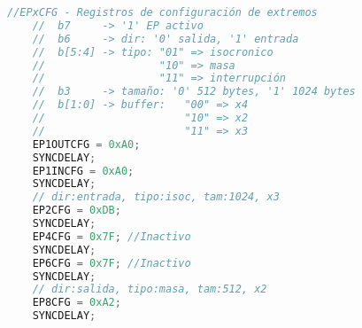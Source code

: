 	\begin{lstlisting}[language=C,backgroundcolor=\color{gray!30}]
	//EPxCFG - Registros de configuración de extremos
	//	b7 	   -> '1' EP activo
	//	b6 	   -> dir: '0' salida, '1' entrada
	//	b[5:4] -> tipo: "01" => isocronico
	//					"10" => masa
	//					"11" => interrupción
	//	b3 	   -> tamaño: '0' 512 bytes, '1' 1024 bytes
	//	b[1:0] -> buffer: 	"00" => x4
	//						"10" => x2
	//						"11" => x3
	EP1OUTCFG = 0xA0;
	SYNCDELAY;
	EP1INCFG = 0xA0;
	SYNCDELAY;
	// dir:entrada, tipo:isoc, tam:1024, x3
	EP2CFG = 0xDB;
	SYNCDELAY;
	EP4CFG = 0x7F; //Inactivo
	SYNCDELAY;
	EP6CFG = 0x7F; //Inactivo
	SYNCDELAY;
	// dir:salida, tipo:masa, tam:512, x2
	EP8CFG = 0xA2; 
	SYNCDELAY;
	\end{lstlisting}
	

%	
%	

